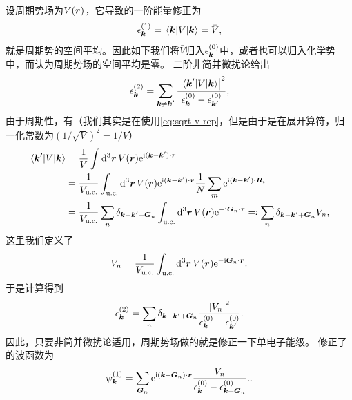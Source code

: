 设周期势场为$V(\vb*{r})$，它导致的一阶能量修正为
\begin{equation}
    \epsilon_{\vb*{k}}^{(1)} = \mel{\vb*{k}}{V}{\vb*{k}} = \bar{V},
    \label{eq:first-order-energy-perturbation}
\end{equation}
就是周期势的空间平均。因此如下我们将$\bar{V}$归入$\epsilon_{\vb*{k}}^{(0)}$中，或者也可以归入化学势中，而认为周期势场的空间平均是零。
二阶非简并微扰论给出
\begin{equation}
    \epsilon_{\vb*{k}}^{(2)} = \sum_{\vb*{k} \neq \vb*{k}'} \frac{\abs{\mel*{\vb*{k}'}{V}{\vb*{k}}}^2}{\epsilon_{\vb*{k}}^{(0)} - \epsilon_{\vb*{k}'}^{(0)}},
\end{equation}
由于周期性，有（我们其实是在使用\eqref{eq:sqrt-v-rep}，但是由于是在展开算符，归一化常数为$(1/\sqrt{V})^2 = 1 / V$）
\begin{equation}
    \begin{aligned}
        \mel*{\vb*{k}'}{V}{\vb*{k}} &= \frac{1}{V} \int \dd[3]{\vb*{r}} V(\vb*{r}) \mathrm{e}^{\mathrm{i} (\vb*{k} - \vb*{k}') \cdot \vb*{r}} \\
        &= \frac{1}{V_\text{u.c.}} \int_\text{u.c.} \dd[3]{\vb*{r}} V(\vb*{r}) \mathrm{e}^{\mathrm{i} (\vb*{k} - \vb*{k}') \cdot \vb*{r}} \frac{1}{N} \sum_m \mathrm{e}^{\mathrm{i} (\vb*{k} - \vb*{k}') \cdot \vb*{R}_i} \\
        &= \frac{1}{V_\text{u.c.}} \sum_n \delta_{\vb*{k} - \vb*{k}' + \vb*{G}_n} \int_\text{u.c.} \dd[3]{\vb*{r}} V(\vb*{r}) \mathrm{e}^{- \mathrm{i} \vb*{G}_n \cdot \vb*{r}} \eqqcolon \sum_n \delta_{\vb*{k} - \vb*{k}' + \vb*{G}_n} V_n,
    \end{aligned}
\end{equation}
这里我们定义了
\begin{equation}
    V_n = \frac{1}{V_\text{u.c.}} \int_\text{u.c.} \dd[3]{\vb*{r}} V(\vb*{r}) \mathrm{e}^{- \mathrm{i} \vb*{G}_n \cdot \vb*{r}}.
\end{equation}
于是计算得到
\begin{equation}
    \epsilon_{\vb*{k}}^{(2)} = \sum_{n} \delta_{\vb*{k} - \vb*{k}' + \vb*{G}_n} \frac{\abs{V_n}^2}{\epsilon_{\vb*{k}}^{(0)} - \epsilon_{\vb*{k}'}^{(0)}} .
\end{equation}
因此，只要非简并微扰论适用，周期势场做的就是修正一下单电子能级。
修正了的波函数为
\begin{equation}
    \psi_{\vb*{k}}^{(1)} = \sum_{\vb*{G}_n} \mathrm{e}^{\mathrm{i} (\vb*{k} + \vb*{G}_n) \cdot \vb*{r}} \frac{V_n}{\epsilon_{\vb*{k}}^{(0)} - \epsilon_{\vb*{k} + \vb*{G}_n}^{(0)}}.
    .
    \label{eq:non-degenerate-wave-function} 
\end{equation}

